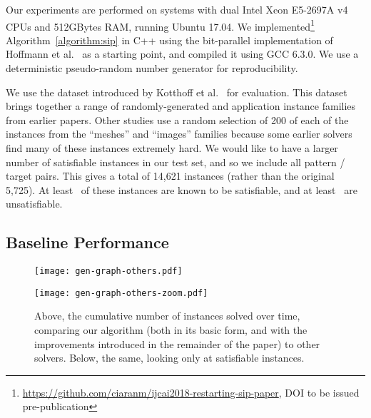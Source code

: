 \documentclass[a4paper,UKenglish]{lipics-v2018}
\newcommand{\algorithmref}[1]{Algorithm~\ref{#1}}
\begin{document}
Our experiments are performed on systems with dual Intel Xeon E5-2697A v4 CPUs and 512GBytes RAM,
running Ubuntu 17.04. We
implemented\footnote{\url{https://github.com/ciaranm/ijcai2018-restarting-sip-paper}, DOI to be issued pre-publication}
\algorithmref{algorithm:sip} in C++ using the bit-parallel implementation of
Hoffmann et al.\ \cite{DBLP:conf/aaai/HoffmannMR17} as a starting point, and compiled it using GCC 6.3.0. We use a
deterministic pseudo-random number generator for reproducibility.

We use the dataset introduced by Kotthoff et al.\ \cite{DBLP:conf/lion/KotthoffMS16} for evaluation. This dataset
brings together a range of randomly-generated and application instance families from earlier papers.
Other studies use a random selection of 200 of each of the instances from the ``meshes'' and
``images'' families because some earlier solvers find many of these instances extremely hard. We
would like to have a larger number of satisfiable instances in our test set, and so we include all
pattern / target pairs. This gives a total of 14,621 instances (rather than the original 5,725). At
least \unskip\ of these instances are known to be satisfiable, and at least
\unskip\ are unsatisfiable.

\subsection{Baseline Performance}

\begin{figure}[tb]
    \centering
    \texttt{[image: gen-graph-others.pdf]}

    \bigskip

    \centering
    \texttt{[image: gen-graph-others-zoom.pdf]}

    \caption{Above, the cumulative number of instances solved over time, comparing our algorithm
    (both in its basic form, and with the improvements introduced in the remainder of the paper) to
    other solvers. Below, the same, looking only at satisfiable instances.}
    \label{figure:others}
\end{figure}
\end{document}
